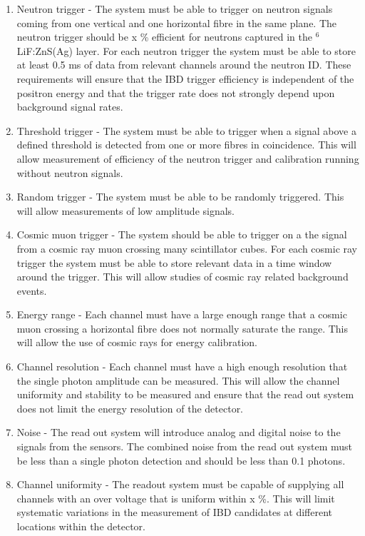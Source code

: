 \documentclass[a4paper]{article}
\begin{document}
\begin{enumerate}
\item Neutron trigger - The system must be able to trigger on neutron signals coming from one vertical and one horizontal fibre in the same plane. 
    The neutron trigger should be x \% efficient for neutrons captured in the $^6$LiF:ZnS(Ag) layer. 
    For each neutron trigger the system must be able to store at least 0.5 ms of data from relevant channels around the neutron ID. 
    These requirements will ensure that the IBD trigger efficiency is independent of the positron energy and that the trigger rate does not strongly depend upon background signal rates.
\item Threshold trigger - The system must be able to trigger when a signal above a defined threshold is detected from one or more fibres in coincidence.
    This will allow measurement of efficiency of the neutron trigger and calibration running without neutron signals.
\item Random trigger -  The system must be able to be randomly triggered. 
    This will allow measurements of low amplitude signals.
\item Cosmic muon trigger - The system should be able to trigger on a the signal from a cosmic ray muon crossing many scintillator cubes. 
    For each cosmic ray trigger the system must be able to store relevant data in a time window around the trigger. 
    This will allow studies of cosmic ray related background events.
\item Energy range - Each channel must have a large enough range that a cosmic muon crossing a horizontal fibre does not normally saturate the range. 
    This will allow the use of cosmic rays for energy calibration. 
\item Channel resolution - Each channel must have a high enough resolution that the single photon amplitude can be measured. 
    This will allow the channel uniformity and stability to be measured and ensure that the read out system does not limit the energy resolution of the detector.
\item Noise - The read out system will introduce analog and digital noise to the signals from the sensors. 
    The combined noise from the read out system must be less than a single photon detection and should be less than 0.1 photons.
\item Channel uniformity - The readout system must be capable of supplying all channels with an over voltage that is uniform within x \%. 
    This will limit systematic variations in the measurement of IBD candidates at different locations within the detector.

\end{enumerate}
\end{document}
